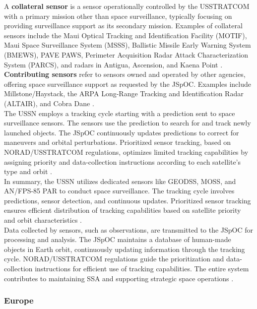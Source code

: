 A \textbf{collateral sensor} is a sensor operationally controlled by the USSTRATCOM with a primary mission other than space surveillance, typically focusing on providing surveillance support as its secondary mission. Examples of collateral sensors include the Maui Optical Tracking and Identification Facility (MOTIF), Maui Space Surveillance System (MSSS), Ballistic Missile Early Warning System (BMEWS), PAVE PAWS, Perimeter Acquisition Radar Attack Characterization System (PARCS), and radars in Antigua, Ascension, and Kaena Point \cite{usssn}.\\

\textbf{Contributing sensors} refer to sensors owned and operated by other agencies, offering space surveillance support as requested by the JSpOC. Examples include Millstone/Haystack, the ARPA Long-Range Tracking and Identification Radar (ALTAIR), and Cobra Dane \cite{usssn}.\\

The USSN employs a tracking cycle starting with a prediction sent to space surveillance sensors. The sensors use the prediction to search for and track newly launched objects. The JSpOC continuously updates predictions to correct for maneuvers and orbital perturbations. Prioritized sensor tracking, based on NORAD/USSTRATCOM regulations, optimizes limited tracking capabilities by assigning priority and data-collection instructions according to each satellite's type and orbit \cite{usssn}.\\

In summary, the USSN utilizes dedicated sensors like GEODSS, MOSS, and AN/FPS-85 PAR to conduct space surveillance. The tracking cycle involves predictions, sensor detection, and continuous updates. Prioritized sensor tracking ensures efficient distribution of tracking capabilities based on satellite priority and orbit characteristics \cite{usssn}.\\

Data collected by sensors, such as observations, are transmitted to the JSpOC for processing and analysis. The JSpOC maintains a database of human-made objects in Earth orbit, continuously updating information through the tracking cycle. NORAD/USSTRATCOM regulations guide the prioritization and data-collection instructions for efficient use of tracking capabilities. The entire system contributes to maintaining SSA and supporting strategic space operations \cite{usssn}.\\


\subsubsection{Europe}

